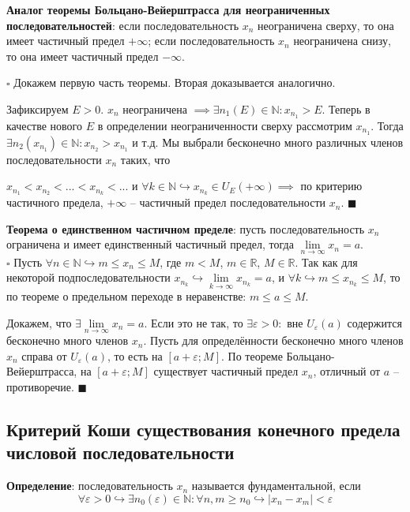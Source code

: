 \documentclass[12pt, a4paper, reqno]{article}
\begin{document}
    \textbf{Аналог теоремы Больцано-Вейерштрасса для неограниченных последовательностей}: если
    последовательность $x_n$ неограничена сверху, то она имеет частичный предел $+\infty$; если
    последовательность $x_n$ неограничена снизу, то она имеет частичный предел $-\infty$.

    $\square$ Докажем первую часть теоремы. Вторая доказывается аналогично.

    Зафиксируем $E > 0$. $x_n$ неограничена $\implies \exists n_1(E)\in\mathbb{N}: x_{n_1} > E$.
    Теперь в качестве нового $E$ в определении неограниченности сверху рассмотрим $x_{n_1}$. Тогда
    $\exists n_2(x_{n_1})\in\mathbb{N}: x_{n_2} > x_{n_1}$ и т.д. Мы выбрали бесконечно много
    различных членов последовательности $x_n$ таких, что

    $x_{n_1} < x_{n_2} < ... < x_{n_k} < ...$ и $\forall k\in\mathbb{N} \hookrightarrow
    x_{n_k}\in U_{E}(+\infty) \implies$ по критерию частичного предела, $+\infty$ -- частичный предел
    последовательности $x_n$. $\blacksquare$

    \textbf{Теорема о единственном частичном пределе}: пусть последовательность $x_n$ ограничена и
    имеет единственный частичный предел, тогда $\lim\limits_{n\to\infty} x_n = a$.\\
    $\square$ Пусть $\forall n\in\mathbb{N} \hookrightarrow m
    \leq x_n \leq M$, где $m < M$, $m\in\mathbb{R}$, $M\in\mathbb{R}$. Так как для некоторой
    подпоследовательности $x_{n_k} \hookrightarrow \lim\limits_{k\to\infty} x_{n_k} = a$, и
    $\forall k \hookrightarrow m \leq x_{n_k} \leq M$, то по теореме о предельном переходе в
    неравенстве: $m \leq a \leq M$.

    Докажем, что $\exists\lim\limits_{n\to\infty} x_n = a$. Если это не так, то
    $\exists\varepsilon > 0:$ вне $U_{\varepsilon}(a)$ содержится бесконечно много членов $x_n$.
    Пусть для определённости бесконечно много членов $x_n$ справа от $U_{\varepsilon}(a)$, то есть
    на $[a + \varepsilon; M]$. По теореме Больцано-Вейерштрасса, на $[a + \varepsilon; M]$
    существует частичный предел $x_n$, отличный от $a$ -- противоречие. $\blacksquare$

\subsection{Критерий Коши существования конечного предела числовой последовательности}

    \textbf{Определение}: последовательность $x_n$ называется фундаментальной, если
    \begin{equation*}
        \forall\varepsilon > 0 \hookrightarrow \exists n_0(\varepsilon)\in\mathbb{N}: \forall n, m
        \geq n_0 \hookrightarrow |x_n - x_m| < \varepsilon
    \end{equation*}
\end{document}
